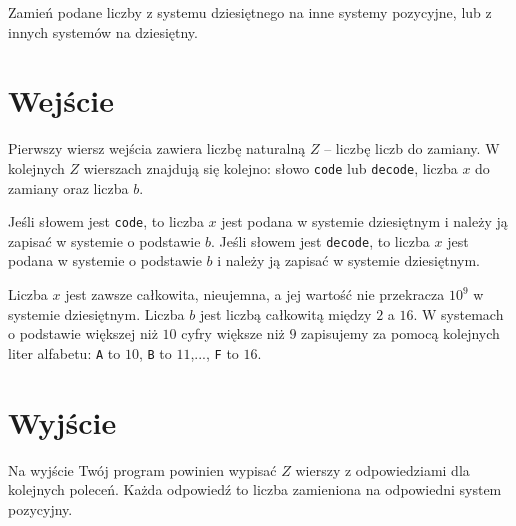 \documentclass{spiral-kurs}
\begin{document}
  \makeheader

  Zamień podane liczby z systemu dziesiętnego na inne systemy pozycyjne, lub z innych systemów na dziesiętny.

  \section{Wejście}
Pierwszy wiersz wejścia zawiera liczbę naturalną $Z$ -- liczbę liczb do zamiany. W kolejnych $Z$ wierszach znajdują się kolejno: słowo \texttt{code} lub \texttt{decode}, liczba $x$ do zamiany oraz liczba $b$.

Jeśli słowem jest \texttt{code}, to liczba $x$ jest podana w systemie dziesiętnym i należy ją zapisać w systemie o podstawie $b$.
Jeśli słowem jest \texttt{decode}, to liczba $x$ jest podana w systemie o podstawie $b$ i należy ją zapisać w systemie dziesiętnym.

Liczba $x$ jest zawsze całkowita, nieujemna, a jej wartość nie przekracza $10^9$ w systemie dziesiętnym. Liczba $b$ jest liczbą całkowitą między $2$ a $16$. W systemach o podstawie większej niż $10$ cyfry większe niż $9$ zapisujemy za pomocą kolejnych liter alfabetu: \texttt{A} to $10$, \texttt{B} to $11$,..., \texttt{F} to $16$.

  \section{Wyjście}
Na wyjście Twój program powinien wypisać $Z$ wierszy z odpowiedziami dla kolejnych poleceń. Każda odpowiedź to liczba zamieniona na odpowiedni system pozycyjny.

\end{document}
